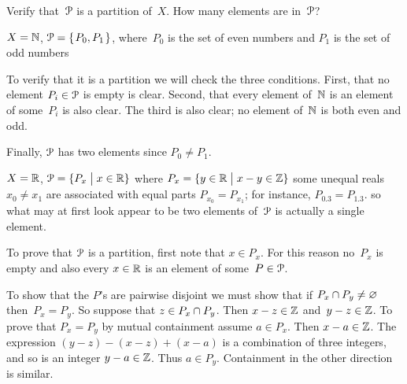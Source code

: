\documentclass{ibl}  %
\begin{document}
\begin{center}
\end{center}

\begin{problem} 
  Verify that~$\EuScript{P}$ is a partition of~$X$.  
  How many elements are in~$\EuScript{P}$?
\begin{exes}
\begin{exercise} 
  $X=\mathbb{N}$, $\EuScript{P}=\mbox{$\{\hspace{0.1em}P_0,P_1\hspace{0.1em}\}$}$, 
  where~$P_0$ is the set of even numbers
  and $P_1$ is the set of odd numbers
\end{exercise}
\begin{answer}
  To verify that it is a partition we will check the three conditions.
  First, that no element $P_i\in \EuScript{P}$ is empty is clear.
  Second, that every element of~$\mathbb{N}$ is an element of some~$P_i$ is
  also clear.
  The third is also clear; no element of~$\mathbb{N}$ is both even and odd.

  Finally, $\EuScript{P}$ has two elements since $P_0\neq P_1$.  
\end{answer}
\begin{exercise} 
      $X=\mathbb{R}$, $\EuScript{P}=\{P_x \bigm| x\in \mathbb{R}\}$
      where $P_x=\{y\in\mathbb{R} \bigm| x-y\in \mathbb{Z}\}$
      \hspace{0.75em}\hint some unequal reals $x_0\neq x_1$ 
      are associated with equal parts $P_{x_0}=P_{x_1}$; 
      for instance, $P_{0.3}=P_{1.3}$.  
      so what may at first look appear to be two elements of~$\EuScript{P}$
      is actually a single element.
\end{exercise}
\begin{answer}
  To prove that $\EuScript{P}$ is a partition, first note that $x\in P_x$.
  For this reason no~$P_x$ is empty and also
  every $x\in\mathbb{R}$ is an element of some~$P\in\EuScript{P}$.

  To show that the $P$'s are pairwise disjoint 
  we must show that
  if $P_x\cap P_y\neq\varnothing$ then~$P_x=P_y$.
  So suppose that $z\in P_x\cap P_y$.
  Then $x-z\in\mathbb{Z}$ and~$y-z\in \mathbb{Z}$.
  To prove that $P_x=P_y$ by mutual containment assume $a\in P_x$.
  Then $x-a\in\mathbb{Z}$.
  The expression $(y-z)-(x-z)+(x-a)$ is a combination of three integers,
  and so is an integer $y-a\in\mathbb{Z}$.
  Thus $a\in P_y$.
  Containment in the other direction is similar.


\end{answer}
\end{exes}
\end{problem}
\end{document}
